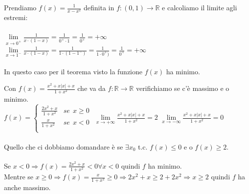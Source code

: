 \begin{example}
Prendiamo $f(x) = \frac{1}{x - x^2}$ definita in $f:(0,1) \to \mathbb{R}$ e calcoliamo il limite agli estremi:\\ \\
$\lim\limits_{x\to 0^+}\frac{1}{x \cdot (1 - x)} = \frac{1}{0^+ \cdot 1} = \frac{1}{0^+} = +\infty$ \hspace{.7cm}
$\lim\limits_{x\to 1^-}\frac{1}{x \cdot (1 - x)} = \frac{1}{1 \cdot (1 - 1^-)} = \frac{1}{1 \cdot 0^+)} = \frac{1}{0^+} = +\infty$\\ \\
In questo caso per il teorema visto la funzione $f(x)$ ha minimo.
\end{example}
\begin{example}
Con $f(x) = \frac{x^2 + x|x| + x}{1 + x^2}$ che va da $f: \mathbb{R}\to \mathbb{R}$ verifichiamo se c'è massimo e o minimo.\\
$f(x) = \begin{cases}
    \frac{2x^2 + x}{1 + x^2}& se \: \: x \geq 0\\
    \frac{x}{1 + x^2}& se \: \: x < 0\\
\end{cases}$ \hspace{.7cm} $\lim\limits_{x\to +\infty}\frac{x^2 + x|x| + x}{1 + x^2} = 2 $ \hspace{.3cm} $\lim\limits_{x\to -\infty}\frac{x^2 + x|x| + x}{1 + x^2} = 0 $\\\\
Quello che ci dobbiamo domandare è se $\exists x_0$ t.c. $f(x) \leq 0$ e o $f(x) \geq 2$.\\\\
Se $x<0 \Longrightarrow f(x) = \frac{2x^2 + x}{1 + x^2} < 0 \forall x < 0$ quindi $f$ ha minimo.\\
Mentre se $x \geq 0 \Longrightarrow f(x) = \frac{x}{1 + x^2} \geq 0 \Longrightarrow 2x^2 + x \geq 2 + 2x^2 \Longrightarrow x \geq 2$ quindi $f$ ha anche massimo.
\end{example}